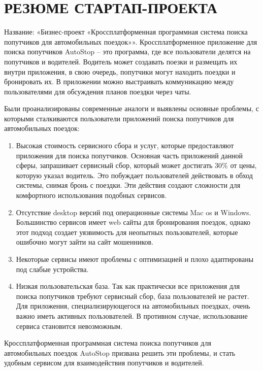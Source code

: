 \section*{РЕЗЮМЕ СТАРТАП-ПРОЕКТА}

Название: «Бизнес-проект «Кроссплатформенная программная система поиска попутчиков для автомобильных поездок»».
Кроссплатформенное приложение для поиска попутчиков AutoStop -- это программа, где все пользователи делятся на попутчиков и водителей. Водитель может создавать поезки и размещать их внутри приложения, в свою очередь, попутчики могут находить поездки и бронировать их. В приложении можно выстраивать коммуникацию между пользователями для обсуждения планов поездки через чаты.

Были проанализированы современные аналоги и выявлены основные проблемы, с которыми сталкиваются пользователи приложений поиска попутчиков для автомобильных поездок:

\begin{enumerate}
	\item Высокая стоимость сервисного сбора и услуг, которые предоставляют приложения для поиска попутчиков. Основная часть приложений данной сферы, запрашивает сервисный сбор, который может достигать 30\% от цены, которую указал водитель. Это побуждает пользователей действовать в обход системы, снимая бронь с поездки. Эти действия создают сложности для комфортного использования подобных сервисов.
	\item Отсутствие desktop версий под операционные системы Mac os и Windows. Большинство сервисов имеет web сайты для бронирования поездок, однако этот подход создает уязвимость для неопытных пользователей, которые ошибочно могут зайти на сайт мошенников.
	\item Некоторые сервисы имеют проблемы с оптимизацией и плохо адаптированы под слабые устройства.
	\item Низкая пользовательская база. Так как практически все приложения для поиска попутчиков требуют сервисный сбор, база пользователей не растет. Для приложения, специализирующегося на автомобильных поездках, очень важно иметь активных пользователей. В противном случае, использование сервиса становится невозможным.
\end{enumerate}

Кроссплатформенная программная система поиска попутчиков для автомобильных поездок AutoStop призвана решить эти проблемы, и стать удобным сервисом для взаимодействия попутчиков и водителей.

